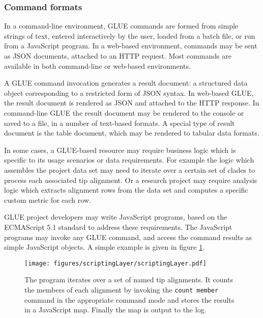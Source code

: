 \subsubsection*{Command formats}
In a command-line environment, GLUE commands are formed from simple strings of
text, entered interactively by the user, loaded from a batch file, or run from a
JavaScript program. In a web-based environment, commands may be sent as JSON
documents, attached to an HTTP request. Most commands are available in
both command-line or web-based environments.

A GLUE command invocation generates a result document: a structured data object
corresponding to a restricted form of JSON syntax. In web-based GLUE, the result
document is rendered as JSON and attached to the HTTP response. In command-line
GLUE the result document may be rendered to the console or saved to a file, in a
number of text-based formats. A special type of result document is the table
document, which may be rendered to tabular data formats.


In some cases, a GLUE-based resource may require business logic which is
specific to its usage scenarios or data requirements. For example the logic
which assembles the project data set may need to iterate over a certain set of
clades to process each associated tip alignment. Or a research project may
require analysis logic which extracts alignment rows from the data set and
computes a specific custom metric for each row.

GLUE project developers may write JavaScript programs, based on the ECMAScript
5.1 standard \cite{EcmaScript_2011} to address these requirements. The
JavaScript programs may invoke any GLUE command, and access the command results
as simple JavaScript objects. A simple example is given in figure
\ref{fig:scriptingLayer}.

  \begin{figure}[h!]
  \begin{center}
  \texttt{[image: figures/scriptingLayer/scriptingLayer.pdf]}
  \end{center}
  \caption{ The program iterates over a set of named tip alignments. It counts the
members of each alignment by invoking the \texttt{count member} command in the
appropriate command mode and stores the results in a JavaScript map. Finally
the map is output to the log.}
  \label{fig:scriptingLayer}
      \end{figure}

